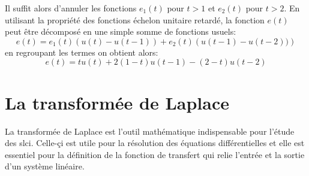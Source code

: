 Il suffit alors d'annuler les fonctions $e_1(t)$ pour $t>1$ et 
$e_2(t)$ pour $t>2$.
En utilisant la propriété des fonctions échelon unitaire retardé, la fonction 
$e(t)$ peut être décomposé en une simple somme de fonctions usuels:
\[
    e(t)=e_1(t)\left(u(t)-u(t-1)\right) + e_2(t)\left(u(t-1)-u(t-2))\right)
\]
en regroupant les termes on obtient alors:
\[
    e(t)=tu(t)+2(1-t)u(t-1)-(2-t)u(t-2)
\]
\newpage
{}
\captionsetup{width=0.9\linewidth}
\section{La transformée de Laplace}
La transformée de Laplace est l'outil mathématique indispensable 
pour l'étude des \gls{slci}. Celle-çi est utile pour 
la résolution des équations différentielles 
et elle est essentiel pour la définition de la fonction de transfert qui relie
l'entrée et la sortie d'un système linéaire.
